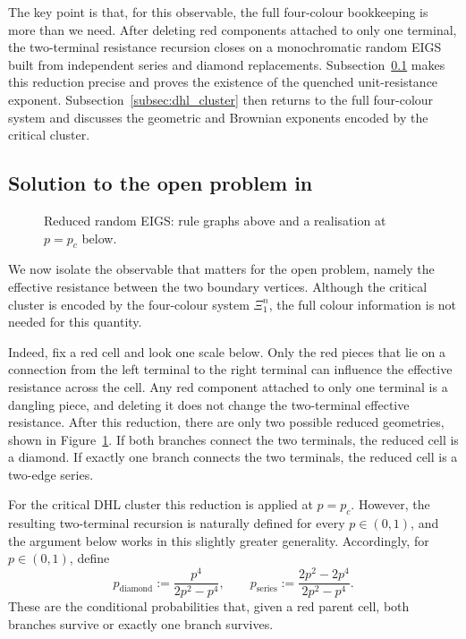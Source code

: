\documentclass{article}
\DeclareRobustCommand{\revision}[1]{{\color{red}#1}}
\theoremstyle{plain}
\theoremstyle{definition}
\begin{document}
The key point is that, for this observable, the full four-colour bookkeeping is more than we need.
After deleting red components attached to only one terminal, the two-terminal resistance recursion closes on a monochromatic random EIGS built from independent series and diamond replacements.
Subsection~\ref{subsec:Quenched unit-resistance exponent} makes this reduction precise and proves the existence of the quenched unit-resistance exponent.
Subsection~\ref{subsec:dhl_cluster} then returns to the full four-colour system and discusses the geometric and Brownian exponents encoded by the critical cluster.


\subsection{Solution to the open problem in \texorpdfstring{\cite{hambly2010diffusion}}{}}\label{subsec:Quenched unit-resistance exponent}

\begin{figure}[bt]
    \centering
    
    \caption{\revision{Reduced random EIGS: rule graphs above and a realisation at $p=p_c$ below.}}
    \label{fig:dhl_reduction}
\end{figure}


We now isolate the observable that matters for the open problem, namely the effective resistance between the two boundary vertices.
Although the critical cluster is encoded by the four-colour system $\Xi_1^n$, the full colour information is not needed for this quantity.

Indeed, fix a red cell and look one scale below.
Only the red pieces that lie on a connection from the left terminal to the right terminal can influence the effective resistance across the cell.
Any red component attached to only one terminal is a dangling piece, and deleting it does not change the two-terminal effective resistance.
After this reduction, there are only two possible reduced geometries, shown in Figure~\ref{fig:dhl_reduction}.
If both branches connect the two terminals, the reduced cell is a diamond.
If exactly one branch connects the two terminals, the reduced cell is a two-edge series.

For the critical DHL cluster this reduction is applied at $p=p_c$.
However, the resulting two-terminal recursion is naturally defined for every $p\in(0,1)$, and the argument below works in this slightly greater generality.
Accordingly, for $p\in(0,1)$, define
\[
p_{\mathrm{diamond}}:=\frac{p^4}{2p^2-p^4},
\qquad
p_{\mathrm{series}}:=\frac{2p^2-2p^4}{2p^2-p^4}.
\]
These are the conditional probabilities that, given a red parent cell, both branches survive or exactly one branch survives.
\end{document}
